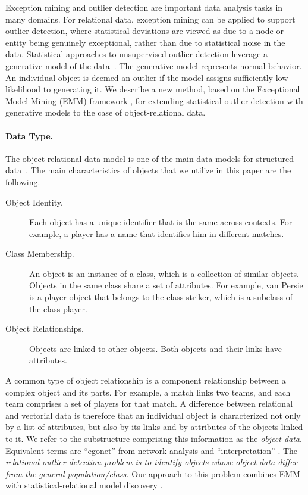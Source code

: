{Exception mining and outlier detection are important data analysis tasks in many domains. For relational data, exception mining can be applied to support outlier detection, where statistical deviations are viewed as due to a node or entity being genuinely exceptional, rather than due to statistical noise in the data. Statistical approaches to unsupervised outlier detection leverage a generative model of the data~\cite{aggarwal2013}. The generative model represents normal behavior. An individual object is deemed an outlier if  the model assigns sufficiently low likelihood to generating it. 
We describe a new method, based on the Exceptional Model Mining (EMM) framework \cite{Duivesteijn2016}, for extending statistical  outlier detection with generative models to the case of object-relational data. 



\paragraph{Data Type.} The object-relational data model is one of the main data models for structured data~\cite{Koller1997}. The main 
characteristics of objects that we utilize in this paper are the following. 

\begin{description}
\item[Object Identity.] Each object has a unique identifier that is the same across contexts. For example, a player has a name that identifies him in different matches. 
\item[Class Membership.] An object is an instance of a class, which is a collection of similar objects. Objects in the same class share a set of attributes. For example, van Persie is a player object that belongs to the class striker, which is a subclass of the  class player.
\item[Object Relationships.] Objects are linked  to other objects. Both objects and their links have attributes. 
\end{description}


A common type of object relationship is a component relationship between a complex object and its parts.
For example, a match links two teams, and each team comprises a set of players for that match. A difference between relational and vectorial data is therefore that an individual object is characterized not only by a list of attributes, but also by its links and by attributes of the objects linked to it. We refer to the substructure comprising this information as the {\em object data}. Equivalent terms are ``egonet'' from network analysis \cite{Akoglu2015} and ``interpretation'' \cite{Maervoet2012}. The {\em relational outlier detection problem is to identify objects whose object data differ from the general population/class.} Our approach to this problem combines EMM with statistical-relational model discovery \cite{SRL2007}.

}
